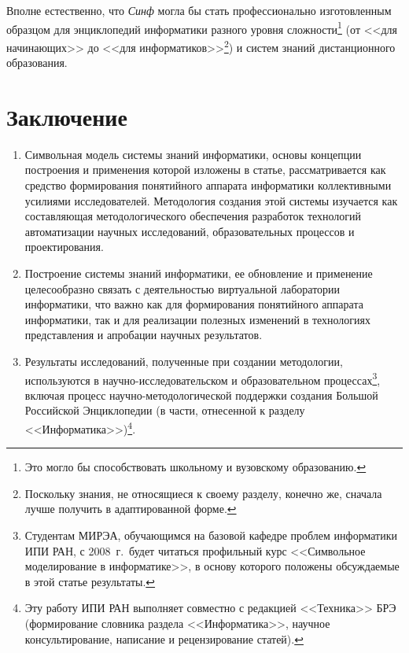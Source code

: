 \begin{multicols}{2}
Вполне естественно, что \textit{Синф} могла бы стать профессионально изготовленным образцом для
энциклопедий информатики разного уровня сложности\footnote{Это могло бы способствовать
школьному и вузовскому образованию.} (от <<для начинающих>> до <<для
информатиков>>\footnote{Поскольку знания, не относящиеся к своему разделу, конечно же,
сначала лучше получить в адаптированной форме.}) и систем знаний дистанционного образования.

\section{Заключение}

\noindent
\begin{enumerate}[1.]
\item Символьная модель системы знаний информатики, основы концепции
построения и применения которой изложены в статье, рас\-смат\-ри\-ва\-ет\-ся 
как средство формирования по\-ня\-тий\-но\-го аппарата информатики 
коллективными\linebreak
 усилиями исследователей. Методология со\-зда\-ния этой 
системы изучается как составля\-ющая методологического обеспечения 
раз\-рабо\-ток технологий автоматизации научных исследова\-ний, образовательных 
процессов и проектирования. {

}
\item Построение системы знаний информатики, ее обновление и применение
целесообразно связать с деятельностью виртуальной лаборатории
информатики, что важно как для формирования понятийного аппарата
информатики, так и для реализации полезных изменений в технологиях
представления и апробации научных результатов.
\item Результаты исследований, полученные при создании методологии, используются в
научно-исследовательском и образовательном процессах\footnote{Студентам МИРЭА, 
обучающимся на базовой кафедре проблем информатики ИПИ РАН, с 2008~г.\ будет 
читаться профильный курс <<Символьное моделирование в информатике>>, в основу 
которого положены обсуждаемые в этой статье результаты.}, включая процесс 
на\-уч\-но-ме\-то\-до\-ло\-ги\-че\-ской поддержки создания Большой Российской 
Энциклопедии (в части, отнесенной к разделу <<Информатика>>)\footnote{Эту 
работу ИПИ РАН выполняет совместно с редакцией <<Техника>> БРЭ (формирование 
словника раздела <<Информатика>>, научное консультирование, написание и 
рецензирование статей).}.
\end{enumerate}

{\small {\baselineskip=10.59pt 
}}
\end{multicols}
